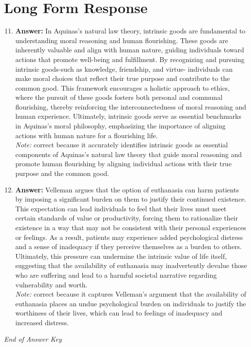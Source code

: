 \documentclass[12pt]{article}
\begin{document}
\section*{Long Form Response}
\begin{enumerate}[label=\arabic*.]
\setcounter{enumi}{10}
\item \textbf{Answer:} In Aquinas's natural law theory, intrinsic goods are fundamental to understanding moral reasoning and human flourishing. These goods are inherently valuable and align with human nature, guiding individuals toward actions that promote well-being and fulfillment. By recognizing and pursuing intrinsic goods-such as knowledge, friendship, and virtue- individuals can make moral choices that reflect their true purpose and contribute to the common good. This framework encourages a holistic approach to ethics, where the pursuit of these goods fosters both personal and communal flourishing, thereby reinforcing the interconnectedness of moral reasoning and human experience. Ultimately, intrinsic goods serve as essential benchmarks in Aquinas's moral philosophy, emphasizing the importance of aligning actions with human nature for a flourishing life.
\\ \textit{Note:} correct because it accurately identifies intrinsic goods as essential components of Aquinas's natural law theory that guide moral reasoning and promote human flourishing by aligning individual actions with their true purpose and the common good.
\item \textbf{Answer:} Velleman argues that the option of euthanasia can harm patients by imposing a significant burden on them to justify their continued existence. This expectation can lead individuals to feel that their lives must meet certain standards of value or productivity, forcing them to rationalize their existence in a way that may not be consistent with their personal experiences or feelings. As a result, patients may experience added psychological distress and a sense of inadequacy if they perceive themselves as a burden to others. Ultimately, this pressure can undermine the intrinsic value of life itself, suggesting that the availability of euthanasia may inadvertently devalue those who are suffering and lead to a harmful societal narrative regarding vulnerability and worth.
\\ \textit{Note:} correct because it captures Velleman's argument that the availability of euthanasia places an undue psychological burden on individuals to justify the worthiness of their lives, which can lead to feelings of inadequacy and increased distress.
\end{enumerate}

\vfill
\noindent\textit{End of Answer Key}
\end{document}
